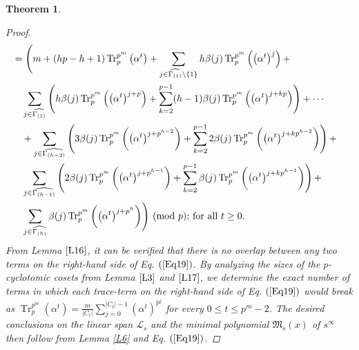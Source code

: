\documentclass[pdflatex,sn-mathphys-num]{sn-jnl}%
\theoremstyle{thmstyleone}%
\newtheorem{theorem}{Theorem}%
\theoremstyle{thmstyletwo}%
\theoremstyle{thmstylethree}%
\begin{document}
\begin{theorem}
\begin{proof}
\begin{align}
            &= \Biggl(m + (hp-h+1)\operatorname{Tr}_{p}^{p^m}\left(\alpha^t\right)+\sum_{j\in\widehat{\Gamma_{(1)}}\setminus\{1\}}h\beta(j)\operatorname{Tr}_{p}^{p^m}\left(\left(\alpha^t\right)^{j}\right)+ \nonumber \\
         &\quad \sum_{j\in\widehat{\Gamma_{(1)}}}\left(h\beta(j)\operatorname{Tr}_{p}^{p^m}\left(\left(\alpha^t\right)^{j+p}\right)+\sum_{k=2}^{p-1}(h-1)\beta(j)\operatorname{Tr}_{p}^{p^m}\left(\left(\alpha^t\right)^{j+kp}\right)\right)+\cdots \nonumber \\
         &\quad + \sum_{j\in\widehat{\Gamma_{(h-2)}}}\left(3\beta(j)\operatorname{Tr}_{p}^{p^m}\left(\left(\alpha^t\right)^{j+p^{h-2}}\right)+\sum_{k=2}^{p-1}2\beta(j)\operatorname{Tr}_{p}^{p^m}\left(\left(\alpha^t\right)^{j+kp^{h-2}}\right)\right)+ \nonumber \\ &\quad \sum_{j\in\widehat{\Gamma_{(h-1)}}}\left(2\beta(j)\operatorname{Tr}_{p}^{p^m}\left(\left(\alpha^t\right)^{j+p^{h-1}}\right)+\sum_{k=2}^{p-1}\beta(j)\operatorname{Tr}_{p}^{p^m}\left(\left(\alpha^t\right)^{j+kp^{h-1}}\right)\right) + \nonumber \\ &\quad \sum_{j\in\widehat{\Gamma_{(h)}}}\beta(j)\operatorname{Tr}_{p}^{p^m}\left(\left(\alpha^t\right)^{j+p^{h}}\right)\Biggr)\textnormal{ (mod $p$);}\text{ for all }t\geq 0.  &
        \end{align}
         From Lemma $\ref{L16}$, it can be verified that there is no overlap between any two terms on the right-hand side of Eq. $(\ref{Eq19})$. By analyzing the sizes of the $p$-cyclotomic cosets from Lemma $\ref{L3}$ and $\ref{L17}$, we determine the exact number of terms in which each trace-term on the right-hand side of Eq. $(\ref{Eq19})$ would break as $\operatorname{Tr}_{p}^{p^m}(\alpha^t)=\frac{m}{|C_{t}|}\sum_{j=0}^{|C_{t}|-1}(\alpha^t)^{p^j}$ for every $0\leq t\leq p^m-2$.  
         \vskip 1pt
         The desired conclusions on the linear span $\mathcal{L}_{s}$ and the minimal polynomial $\mathfrak{M}_{s}(x)$ of $s^{\infty}$ then follow from Lemma \ref{L6} and Eq. $(\ref{Eq19})$.
    \end{proof}
\end{theorem}
\end{document}
